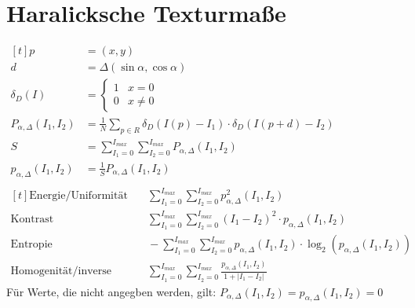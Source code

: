 \setcounter{section}{3}
\section{Haralicksche Texturmaße}
$\begin{aligned}[t]
		p                          & = ( x,  y )                                                               \\
		d                          & = \Delta ( \sin \alpha, \cos \alpha )                                     \\
		\delta_D(I)                & = \begin{cases}
			                               1 & x = 0    \\
			                               0 & x \neq 0
		                               \end{cases}                                                            \\
		P_{\alpha,\Delta}(I_1,I_2)
		                           & =\frac{1}{N} \sum_{p \in R} \delta_D(I(p)-I_1)\cdot \delta_D(I(p+d)-I_2)  \\
		S                          & = \sum_{I_1=0}^{I_{max}}\sum_{I_2=0}^{I_{max}} P_{\alpha,\Delta}(I_1,I_2) \\
		p_{\alpha,\Delta}(I_1,I_2) & = \frac{1}{S} P_{\alpha,\Delta}(I_1,I_2)                                  \\
	\end{aligned}$\\
$\begin{aligned}[t]
		\text{Energie/Uniformität}           & \quad
		\sum_{I_1=0}^{I_{max}}\sum_{I_2=0}^{I_{max}} p^2_{\alpha,\Delta}(I_1,I_2)                                                        \\
		\text{Kontrast}                      & \quad
		\sum_{I_1=0}^{I_{max}}\sum_{I_2=0}^{I_{max}} (I_1-I_2)^2 \cdot p_{\alpha,\Delta}(I_1,I_2)                                        \\
		\text{Entropie}                      & \quad
		- \sum_{I_1=0}^{I_{max}}\sum_{I_2=0}^{I_{max}} p_{\alpha,\Delta}(I_1,I_2) \cdot \log_2 \left( p_{\alpha,\Delta}(I_1,I_2) \right) \\
		\text{Homogenität/inverse Differenz} & \quad
		\sum_{I_1=0}^{I_{max}}\sum_{I_2=0}^{I_{max}}  \frac{p_{\alpha,\Delta}(I_1,I_2)}{1 + |I_1-I_2|}
	\end{aligned}$
\newpage
Für Werte, die nicht angegben werden, gilt: $P_{\alpha,\Delta}(I_1,I_2) = p_{\alpha,\Delta}(I_1,I_2) = 0$
